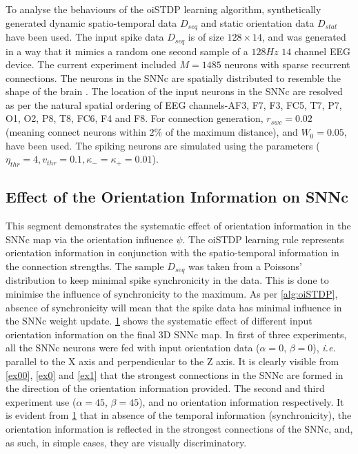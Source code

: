 \begin{figure}
	\label{fig:angle_effect}
\end{figure}
To analyse the behaviours of the oiSTDP learning algorithm, synthetically generated dynamic spatio-temporal data $D_{seq}$ and static orientation data $D_{stat}$ have been used. The input spike data $D_{seq}$ is of size $128 \times 14$, and was generated in a way that it mimics a random one second sample of a $128 Hz$ $14$ channel EEG device. The current experiment included $M=1485$ neurons with sparse recurrent connections. The neurons in the SNNc are spatially distributed to resemble the shape of the brain \citep{kasabov2014neucube}. The location of the input neurons in the SNNc are resolved as per the natural spatial ordering of EEG channels-AF3, F7, F3, FC5, T7, P7, O1, O2, P8, T8, FC6, F4 and F8. For connection generation, $r_{swc}=0.02$ (meaning connect neurons within $2\%$ of the maximum distance), and $W_{0}=0.05$, have been used. The spiking neurons are simulated using the parameters ($\eta_{thr}=4, v_{thr}=0.1, \kappa_-=\kappa_+=0.01$). 

\subsection{Effect of the Orientation Information on SNNc}
This segment demonstrates the systematic effect of orientation information in the SNNc map via the orientation influence $\psi$. The oiSTDP learning rule represents orientation information in conjunction with the spatio-temporal information in the connection strengths. The sample $D_{seq}$ was taken from a Poissons' distribution to keep minimal spike synchronicity in the data. This is done to minimise the influence of synchronicity to the maximum. As per \algorithmname \ref{alg:oiSTDP}, absence of synchronicity will mean that the spike data has minimal influence in the SNNc weight update. \figurename \ref{fig:angle_effect} shows the systematic effect of different input orientation information on the final 3D SNNc map. In first of three experiments, all the SNNc neurons were fed with input orientation data ($\alpha=0$\textdegree, $\beta=0$\textdegree), \emph{i.e.} parallel to the X axis and perpendicular to the Z axis. It is clearly visible from \figurenames \ref{ex00}, \ref{ex0} and \ref{ex1} that the strongest connections in the SNNc are formed in the direction of the orientation information provided. The second and third experiment use ($\alpha=45$\textdegree, $\beta=45$\textdegree), and no orientation information respectively. It is evident from \figurename \ref{fig:angle_effect} that in absence of the temporal information (synchronicity), the orientation information is reflected in the strongest connections of the SNNc, and, as such, in simple cases, they are visually discriminatory.

